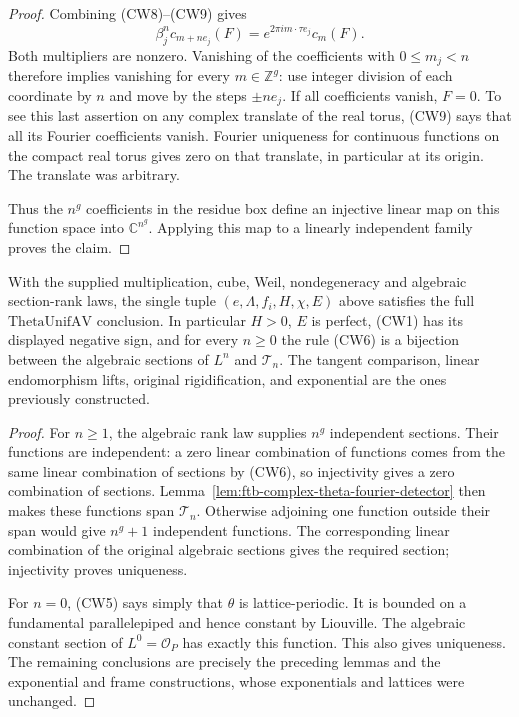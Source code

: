 \begin{proof}
Combining (CW8)--(CW9) gives
\[
       \beta_j^n c_{m+ne_j}(F)
                         =e^{2\pi i m\cdot\tau e_j}c_m(F).  \tag{CW10}
\]
Both multipliers are nonzero.  Vanishing of the coefficients
with \(0\leq m_j<n\) therefore implies vanishing for every
\(m\in\mathbb Z^g\): use integer division of each coordinate
by \(n\) and move by the steps \(\pm ne_j\).
If all coefficients vanish, \(F=0\).  To see this last assertion
on any complex translate of the real torus, (CW9) says that all
its Fourier coefficients vanish.  Fourier uniqueness for continuous
functions on the compact real torus gives zero on that translate,
in particular at its origin.  The translate was arbitrary.

Thus the \(n^g\) coefficients in the residue box define an injective
linear map on this function space into \(\mathbb C^{n^g}\).
Applying this map to a linearly independent family proves the claim.
\end{proof}

\begin{srproposition}
\label{prop:ftb-full-fixed-fibre-theta-realization}
With the supplied multiplication, cube, Weil, nondegeneracy and
algebraic section-rank laws, the single tuple
\((e,\Lambda,f_i,H,\chi,E)\) above satisfies the full
\(\mathrm{ThetaUnifAV}\) conclusion.  In particular \(H>0\),
\(E\) is perfect, (CW1) has its displayed negative sign, and for
every \(n\geq0\) the rule (CW6) is a bijection between the
algebraic sections of \(L^n\) and \(\mathcal T_n\).
The tangent comparison, linear endomorphism lifts, original
rigidification, and exponential are the ones previously constructed.
\end{srproposition}

\begin{proof}
For \(n\geq1\), the algebraic rank law supplies \(n^g\) independent
sections.  Their functions are independent: a zero linear
combination of functions comes from the same linear combination
of sections by (CW6), so injectivity gives a zero combination of
sections.  Lemma~\ref{lem:ftb-complex-theta-fourier-detector}
then makes these functions span \(\mathcal T_n\).
Otherwise adjoining one function outside their span would give
\(n^g+1\) independent functions.  The corresponding linear combination
of the original algebraic sections gives the required section;
injectivity proves uniqueness.

For \(n=0\), (CW5) says simply that \(\theta\) is lattice-periodic.
It is bounded on a fundamental parallelepiped and hence constant
by Liouville.  The algebraic constant section of \(L^0=\mathcal O_P\)
has exactly this function.  This also gives uniqueness.
The remaining conclusions are precisely the preceding lemmas
and the exponential and frame constructions, whose exponentials
and lattices were unchanged.
\end{proof}


